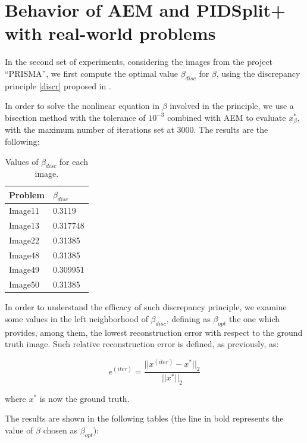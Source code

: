 \section{Behavior of AEM and PIDSplit+ with real-world problems}

In the second set of experiments, considering the images from the project ``PRISMA'', we first compute the optimal value $\beta_{disc}$ for $\beta$, using the discrepancy principle \eqref{discr} proposed in \citep{discr_princ}.

In order to solve the nonlinear equation in $\beta$ involved in the principle, we use a bisection method with the tolerance of $10^{-3}$ combined with AEM to evaluate $x_{\beta}^*$, with the maximum number of iterations set at 3000. The results are the following:

\begin{table}[H]
\begin{center}
\renewcommand*{\arraystretch}{1.6}
\begin{tabular}{|C{1.8cm}|C{2.2cm}|}
\hline
Problem & $\beta_{disc}$ \\
\hline
Image11 & 0.3119 \\ \hline
Image13 & 0.317748 \\ \hline
Image22 & 0.31385 \\ \hline
Image48 & 0.31385 \\ \hline
Image49 & 0.309951 \\ \hline
Image50 & 0.31385 \\
\hline
\end{tabular}
\caption{Values of $\beta_{disc}$ for each image.}
\end{center}
\end{table}

In order to understand the efficacy of such discrepancy principle, we examine some values in the left neighborhood of $\beta_{disc}$, defining as $\beta_{opt}$ the one which provides, among them, the lowest reconstruction error with respect to the ground truth image. Such relative reconstruction error is defined, as previously, as:

$$e^{(iter)} =  \dfrac{||x^{(iter)}-x^*||_2}{||x^*||_2}$$

where $x^*$ is now the ground truth.

The results are shown in the following tables (the line in bold represents the value of $\beta$ chosen as $\beta_{opt}$):

